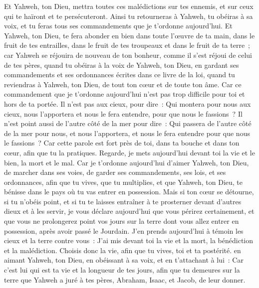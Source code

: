 \begin{multicols}{2}
Et Yahweh, ton Dieu, mettra toutes ces malédictions sur tes ennemis, et sur ceux qui te haïront et te persécuteront.
Ainsi tu retourneras à Yahweh, tu obéiras à sa voix, et tu feras tous ses commandements que je t'ordonne aujourd'hui.
Et Yahweh, ton Dieu, te fera abonder en bien dans toute l'œuvre de ta main, dans le fruit de tes entrailles, dans le fruit de tes troupeaux et dans le fruit de ta terre~; car Yahweh se réjouira de nouveau de ton bonheur, comme il s'est réjoui de celui de tes pères,
quand tu obéiras à la voix de Yahweh, ton Dieu, en gardant ses commandements et ses ordonnances écrites dans ce livre de la loi, quand tu reviendras à Yahweh, ton Dieu, de tout ton cœur et de toute ton âme.
Car ce commandement que je t'ordonne aujourd'hui n'est pas trop difficile pour toi et hors de ta portée.
Il n'est pas aux cieux, pour dire~: Qui montera pour nous aux cieux, nous l'apportera et nous le fera entendre, pour que nous le fassions~?
Il n'est point aussi de l'autre côté de la mer pour dire~: Qui passera de l'autre côté de la mer pour nous, et nous l'apportera, et nous le fera entendre pour que nous le fassions~?
Car cette parole est fort près de toi, dans ta bouche et dans ton cœur, afin que tu la pratiques.
Regarde, je mets aujourd'hui devant toi la vie et le bien, la mort et le mal.
Car je t'ordonne aujourd'hui d'aimer Yahweh, ton Dieu, de marcher dans ses voies, de garder ses commandements, ses lois, et ses ordonnances, afin que tu vives, que tu multiplies, et que Yahweh, ton Dieu, te bénisse dans le pays où tu vas entrer en possession.
Mais si ton cœur se détourne, si tu n'obéis point, et si tu te laisses entraîner à te prosterner devant d'autres dieux et à les servir,
je vous déclare aujourd'hui que vous périrez certainement, et que vous ne prolongerez point vos jours sur la terre dont vous allez entrer en possession, après avoir passé le Jourdain.
J'en prends aujourd'hui à témoin les cieux et la terre contre vous~: J'ai mis devant toi la vie et la mort, la bénédiction et la malédiction. Choisis donc la vie, afin que tu vives, toi et ta postérité.
en aimant Yahweh, ton Dieu, en obéissant à sa voix, et en t'attachant à lui~: Car c'est lui qui est ta vie et la longueur de tes jours, afin que tu demeures sur la terre que Yahweh a juré à tes pères, Abraham, Isaac, et Jacob, de leur donner.

\end{multicols}
